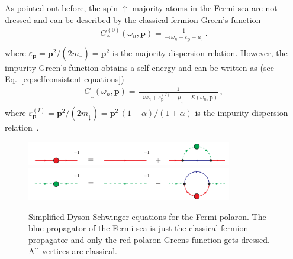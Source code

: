 As pointed out before, the spin-$\uparrow$ majority atoms in the Fermi sea are not dressed and can be described by the classical fermion Green's function
%
\begin{align}
	\label{eq:maj}
    G^{(0)}_{\uparrow}(\omega_n, \bm{p})
    = \frac{1}{-i\omega_n+\varepsilon_{\bm{p}}-\mu_{\uparrow}} \,.
\end{align}
%
where $\varepsilon_{\bm{p}}=\bm{p}^2/(2m_{\uparrow})=\bm{p}^2$ is the majority dispersion relation. However, the impurity Green's function obtains a self-energy and can be written as (see Eq.~\eqref{eq:selfconsistent-equations})
%
\begin{align}
	\label{eq:min}
    G_{\downarrow}(\omega_n, \bm{p})
    = \frac{1}{-i\omega_n+\varepsilon^{(I)}_{\bm{p}}-\mu_{\downarrow}
    -\Sigma(\omega_n, \bm{p})} \,,
\end{align}
%
where $\varepsilon^{(I)}_{\bm{p}}=\bm{p}^2/(2m_{\downarrow}) = \bm{p}^2\,(1-\alpha)/(1+\alpha)$ is the impurity dispersion relation~\cite{Hu2022}.

\begin{figure}[t]
	\begin{center}
		\includegraphics[width=0.8\textwidth]{figs/polaron_prop_DSE.pdf} \\
		\vspace{0.5cm}
		\includegraphics[width=0.8\textwidth]{figs/polaron_boson_DSE.pdf} 
	\end{center}
	\caption[Polaron Dyson-Schwinger equations]{Simplified Dyson-Schwinger equations for the Fermi polaron. The blue propagator of the Fermi sea is just the classical fermion propagator and only the red polaron Greens function gets dressed. All vertices are classical.}
	\label{fig:polaron_DSEs}
\end{figure}

